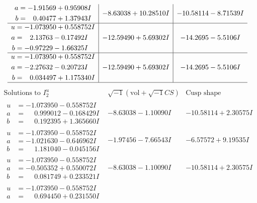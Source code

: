 \documentclass[1p]{elsarticle_modified}
\theoremstyle{definition}
\newcommand{\I}{\sqrt{-1}}
\begin{document}
$$\begin{array}{c|c|c}
\begin{aligned}
a &= -1.91569 + 0.95908 I \\
b &= \phantom{-}0.40477 + 1.37943 I\end{aligned}
 & -8.63038 + 10.28510 I & -10.58114 - 8.71539 I \\ \hline\begin{aligned}
u &= -1.073950 + 0.558752 I \\
a &= \phantom{-}2.13763 - 0.17492 I \\
b &= -0.97229 - 1.66325 I\end{aligned}
 & -12.59490 + 5.69302 I & -14.2695 - 5.5106 I \\ \hline\begin{aligned}
u &= -1.073950 + 0.558752 I \\
a &= -2.27632 - 0.20723 I \\
b &= \phantom{-}0.034497 + 1.175340 I\end{aligned}
 & -12.59490 + 5.69302 I & -14.2695 - 5.5106 I\\
 \hline 
 \end{array}$$\newpage$$\begin{array}{c|c|c}  
\text{Solutions to }I^u_{2}& \I (\text{vol} + \sqrt{-1}CS) & \text{Cusp shape}\\
 \hline 
\begin{aligned}
u &= -1.073950 - 0.558752 I \\
a &= \phantom{-}0.999012 - 0.168429 I \\
b &= \phantom{-}0.192395 + 1.365660 I\end{aligned}
 & -8.63038 - 1.10090 I & -10.58114 + 2.30575 I \\ \hline\begin{aligned}
u &= -1.073950 - 0.558752 I \\
a &= -1.021630 - 0.646962 I \\
b &= \phantom{-}1.181040 - 0.045156 I\end{aligned}
 & -1.97456 - 7.66543 I & -6.57572 + 9.19535 I \\ \hline\begin{aligned}
u &= -1.073950 - 0.558752 I \\
a &= -0.505352 + 0.550072 I \\
b &= \phantom{-}0.081749 + 0.233521 I\end{aligned}
 & -8.63038 - 1.10090 I & -10.58114 + 2.30575 I \\ \hline\begin{aligned}
u &= -1.073950 - 0.558752 I \\
a &= \phantom{-}0.694450 + 0.231550 I \\

\end{aligned}
\end{array}$$
\end{document}

